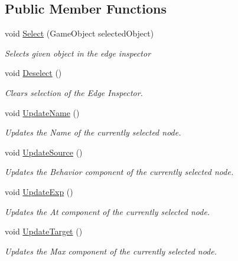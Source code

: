 \subsection*{Public Member Functions}
\begin{DoxyCompactItemize}
\item 
void \hyperlink{class_edge_inspector_a92090d3f3e51f3f0c164c457d3be8eea}{Select} (Game\+Object selected\+Object)
\begin{DoxyCompactList}\small\item\em Selects given object in the edge inspector \end{DoxyCompactList}\item 
void \hyperlink{class_edge_inspector_a695897e9dfd53c8d147f2897d3ff21f9}{Deselect} ()
\begin{DoxyCompactList}\small\item\em Clears selection of the Edge Inspector. \end{DoxyCompactList}\item 
void \hyperlink{class_edge_inspector_a156a07db25d54510f00a336943474fcc}{Update\+Name} ()
\begin{DoxyCompactList}\small\item\em Updates the Name of the currently selected node. \end{DoxyCompactList}\item 
void \hyperlink{class_edge_inspector_a513fd82ff3e791570874421df36ddd9f}{Update\+Source} ()
\begin{DoxyCompactList}\small\item\em Updates the Behavior component of the currently selected node. \end{DoxyCompactList}\item 
void \hyperlink{class_edge_inspector_a2516d546da9c4b3c74f29608a712fa27}{Update\+Exp} ()
\begin{DoxyCompactList}\small\item\em Updates the At component of the currently selected node. \end{DoxyCompactList}\item 
void \hyperlink{class_edge_inspector_a6e6050bef0c14197e73f848ebcab7ecf}{Update\+Target} ()
\begin{DoxyCompactList}\small\item\em Updates the Max component of the currently selected node. \end{DoxyCompactList}\end{DoxyCompactItemize}

